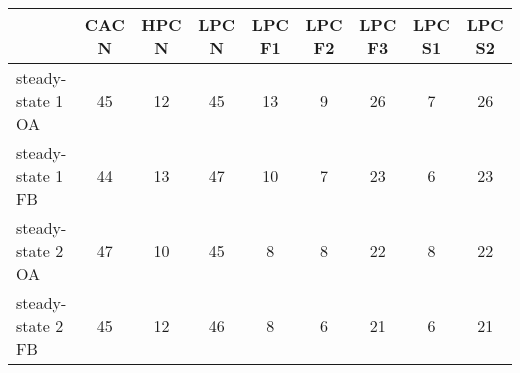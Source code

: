 \begin{minipage}{\linewidth}
    \center
    \footnotesize
    \begin{tabular}{lcccccccc}
        & CAC N & HPC N & LPC N & LPC F1 & LPC F2 & LPC F3 & LPC S1 & LPC S2 \\ \hline
        steady-state 1 OA & 45 & 12 & 45 & 13 & 9 & 26 & 7 & 26 \\
        steady-state 1 FB & 44 & 13 & 47 & 10 & 7 & 23 & 6 & 23 \\
        steady-state 2 OA & 47 & 10 & 45 & 8 & 8 & 22 & 8 & 22 \\
        steady-state 2 FB & 45 & 12 & 46 & 8 & 6 & 21 & 6 & 21 \\ \hline
    \end{tabular}
\end{minipage}
